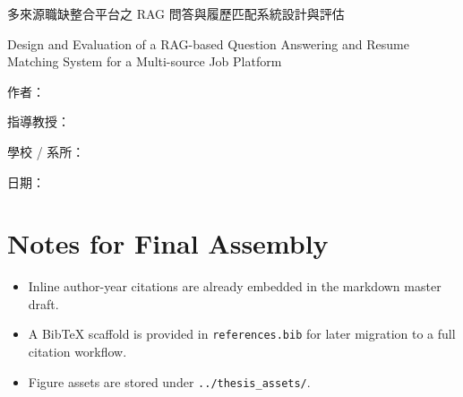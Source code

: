 \documentclass[12pt,a4paper]{ctexbook}
\begin{document}
\frontmatter
\begin{titlepage}
    \centering
    {\Huge 多來源職缺整合平台之 RAG 問答與履歷匹配系統設計與評估 \par}
    \vspace{1.5cm}
    {\Large Design and Evaluation of a RAG-based Question Answering and Resume Matching System for a Multi-source Job Platform \par}
    \vspace{3cm}
    {\Large 作者：\underline{\hspace{5cm}} \par}
    \vspace{0.8cm}
    {\Large 指導教授：\underline{\hspace{5cm}} \par}
    \vspace{0.8cm}
    {\Large 學校 / 系所：\underline{\hspace{5cm}} \par}
    \vfill
    {\Large 日期：\underline{\hspace{5cm}} \par}
\end{titlepage}

\tableofcontents
\clearpage

\mainmatter



\backmatter
\chapter*{Notes for Final Assembly}
\begin{itemize}
  \item Inline author-year citations are already embedded in the markdown master draft.
  \item A BibTeX scaffold is provided in \texttt{references.bib} for later migration to a full citation workflow.
  \item Figure assets are stored under \texttt{../thesis\_assets/}.
\end{itemize}
\end{document}
